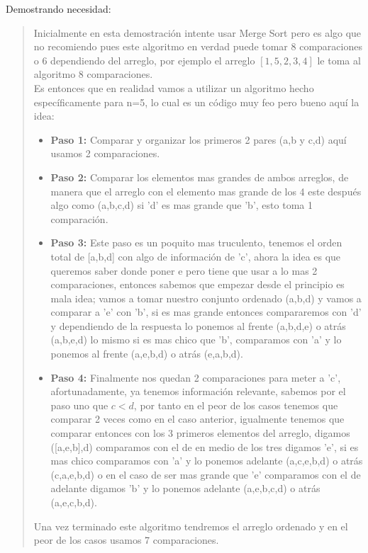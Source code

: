 \textcolor{bibi}{Demostrando necesidad:}
\begin{quote}
    Inicialmente en esta demostración intente usar Merge Sort pero es algo que no recomiendo pues este algoritmo en verdad puede tomar 8 comparaciones o 6 dependiendo del arreglo, por ejemplo el arreglo $[1,5,2,3,4]$ le toma al algoritmo 8 comparaciones.\\

    Es entonces que en realidad vamos a utilizar un algoritmo hecho específicamente para n=5, lo cual es un código muy feo pero bueno aquí la idea:\\
    \begin{itemize}
        \item \textbf{Paso 1:} Comparar y organizar los primeros 2 pares (a,b y c,d) aquí usamos 2 comparaciones.\\
        
        \item \textbf{Paso 2:} Comparar los elementos mas grandes de ambos arreglos, de manera que el arreglo con el elemento mas grande de los 4 este después algo como (a,b,c,d) si 'd' es mas grande que 'b', esto toma 1 comparación.\\
        
        \item \textbf{Paso 3:}  Este paso es un poquito mas truculento, tenemos el orden total de [a,b,d]  con algo de información de 'c', ahora la idea es que queremos saber donde poner e pero tiene que usar a lo mas 2 comparaciones, entonces sabemos que empezar desde el principio es mala idea; vamos a tomar nuestro conjunto ordenado (a,b,d) y vamos a comparar a 'e' con 'b', si es mas grande entonces compararemos con 'd' y dependiendo de la respuesta lo ponemos al frente (a,b,d,e) o atrás (a,b,e,d) lo mismo si es mas chico que 'b', comparamos con 'a' y lo ponemos al frente (a,e,b,d) o atrás (e,a,b,d).\\
        
        \item \textbf{Paso 4:} Finalmente nos quedan 2 comparaciones para meter a 'c', afortunadamente, ya tenemos información relevante, sabemos por el paso uno que $c<d$, por tanto en el peor de los casos tenemos que comparar 2 veces como en el caso anterior, igualmente tenemos que comparar entonces con los 3 primeros elementos del arreglo, digamos ([a,e,b],d) comparamos con el de en medio de los tres digamos 'e', si es mas chico comparamos con 'a' y lo ponemos adelante  (a,c,e,b,d) o atrás (c,a,e,b,d) o en el caso de ser mas grande que 'e' comparamos con el de adelante digamos 'b' y lo ponemos adelante (a,e,b,c,d) o atrás (a,e,c,b,d). 
    \end{itemize}

    Una vez terminado este algoritmo tendremos el arreglo ordenado y en el peor de los casos usamos 7 comparaciones.\\
\end{quote}